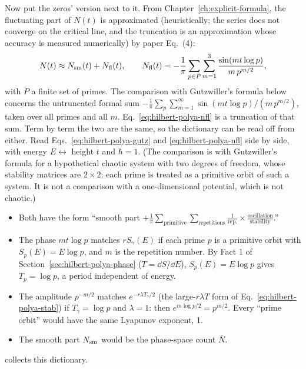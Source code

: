 Now put the zeros' version next to it. From Chapter~\ref{ch:explicit-formula}, the fluctuating part of $N(t)$ is approximated (heuristically; the series does not converge on the critical line, and the truncation is an approximation whose accuracy is measured numerically) by paper Eq.~(4):
\begin{equation}
N(t)\approx N_{\mathrm{sm}}(t)+N_{\mathrm{fl}}(t),\qquad
N_{\mathrm{fl}}(t)=-\frac1\pi\sum_{p\in P}\sum_{m=1}^{3}\frac{\sin(mt\log p)}{m\,p^{m/2}} ,
\label{eq:hilbert-polya-nfl}
\end{equation}
with $P$ a finite set of primes. The comparison with Gutzwiller's formula below concerns the untruncated formal sum $-\frac1\pi\sum_{p}\sum_{m=1}^{\infty}\sin(mt\log p)/(m\,p^{m/2})$, taken over all primes and all $m$. Eq.~\eqref{eq:hilbert-polya-nfl} is a truncation of that sum. Term by term the two are the same, so the dictionary can be read off from either. Read Eqs.~\eqref{eq:hilbert-polya-gutz} and \eqref{eq:hilbert-polya-nfl} side by side, with energy $E\leftrightarrow$ height $t$ and $\hbar=1$. (The comparison is with Gutzwiller's formula for a hypothetical chaotic system with two degrees of freedom, whose stability matrices are $2\times2$; each prime is treated as a primitive orbit of such a system. It is not a comparison with a one-dimensional potential, which is not chaotic.)
\begin{itemize}
\item Both have the form ``smooth part $+\frac1\pi\sum_{\text{primitive}}\sum_{\text{repetitions}}\frac1{\text{rep.}}\times\frac{\text{oscillation}}{\text{stability}}$.''
\item The phase $mt\log p$ matches $rS_\gamma(E)$ if each prime $p$ is a primitive orbit with $S_p(E)=E\log p$, and $m$ is the repetition number. By Fact 1 of Section~\ref{sec:hilbert-polya-phase} ($T=\dd S/\dd E$), $S_p(E)=E\log p$ gives $T_p=\log p$, a period independent of energy.
\item The amplitude $p^{-m/2}$ matches $e^{-r\lambda T_\gamma/2}$ (the large-$r\lambda T$ form of Eq.~\eqref{eq:hilbert-polya-stab}) if $T_\gamma=\log p$ and $\lambda=1$: then $e^{m\log p/2}=p^{m/2}$. Every ``prime orbit'' would have the same Lyapunov exponent, 1.
\item The smooth part $N_{\mathrm{sm}}$ would be the phase-space count $\bar N$.
\end{itemize}
 collects this dictionary.

